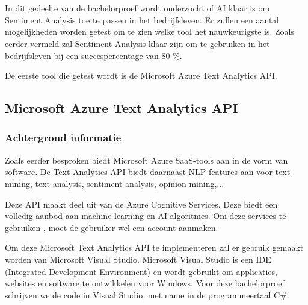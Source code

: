 
\chapter{}
\label{ch:methodologie}


In dit gedeelte van de bachelorproef wordt onderzocht of AI klaar is om Sentiment Analysis toe te passen in het bedrijfsleven. Er zullen een aantal mogelijkheden worden getest om te zien welke tool het nauwkeurigste is. Zoals eerder vermeld zal Sentiment Analysis klaar zijn om te gebruiken in het bedrijfsleven bij een succespercentage van 80 \%. 

De eerste tool die getest wordt is de Microsoft Azure Text Analytics API. 

\section{Microsoft Azure Text Analytics API}

\subsection{Achtergrond informatie}
\label{achtergrondinformatieazure}
Zoals eerder besproken biedt Microsoft Azure SaaS-tools aan in de vorm van software. De Text Analytics API biedt daarnaast NLP features aan voor text mining, text analysis, sentiment analysis, opinion mining,... \autocite{Microsoft2020}

Deze API maakt deel uit van de Azure Cognitive Services. Deze biedt een volledig aanbod aan machine learning en AI algoritmes. Om deze services te gebruiken , moet de gebruiker wel een account aanmaken. \autocite{Microsoft2020}

Om deze Microsoft Text Analytics API te implementeren zal er gebruik gemaakt worden van Microsoft Visual Studio. Microsoft Visual Studio is een IDE (Integrated Development Environment) en wordt gebruikt om applicaties, websites en software te ontwikkelen voor Windows. Voor deze bachelorproef schrijven we de code in Visual Studio, met name in de programmeertaal C\#. 

